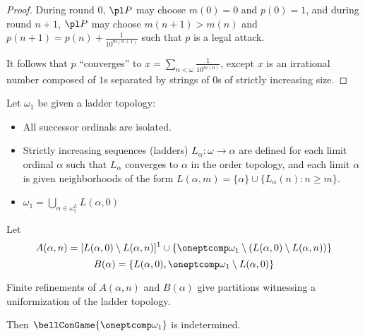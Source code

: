 \begin{proof}
  During round $0$, $\pl P$ may choose $m(0)=0$ and $p(0)=1$,
  and during round $n+1$,
  $\pl P$ may choose $m(n+1)>m(n)$ and
  $p(n+1)=p(n)+\frac{1}{10^{m(n+1)}}$ such that $p$ is a legal attack.

  It follows that $p$ ``converges'' to
  $x=\sum_{n<\omega}\frac{1}{10^{m(n)}}$, except $x$ is an irrational
  number composed of $1$s separated by strings of $0$s of strictly
  increasing size.
\end{proof}

\begin{ex}
  Let $\omega_1$ be given a ladder topology:
    \begin{itemize}
      \item All successor ordinals are isolated.
      \item Strictly increasing sequences (ladders) $L_\alpha:\omega\to\alpha$
            are defined for each limit ordinal $\alpha$ such that $L_\alpha$ converges to $\alpha$ in the order topology, and each limit
            $\alpha$ is given neighborhoods of the form
            $L(\alpha,m)=\{\alpha\}\cup\{L_\alpha(n):n\geq m\}$.
      \item $\omega_1=\bigcup_{\alpha\in\omega_1^L} L(\alpha,0)$
    \end{itemize}

  Let
    \[
      A(\alpha,n)
        =
      [L(\alpha,0)\setminus L(\alpha,n)]^1
        \cup
      \{\oneptcomp\omega_1 \setminus (L(\alpha,0)\setminus L(\alpha,n))\}
    \]
    \[
      B(\alpha)
        =
      \{L(\alpha,0), \oneptcomp\omega_1 \setminus L(\alpha,0)\}
    \]

  Finite refinements of $A(\alpha,n)$ and $B(\alpha)$ give partitions
  witnessing a uniformization of the ladder topology.

  Then $\bellConGame{\oneptcomp\omega_1}$ is indetermined.
\end{ex}

